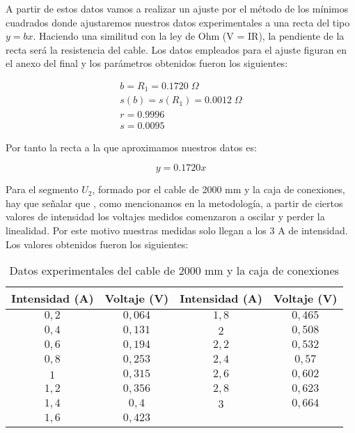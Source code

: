 \documentclass[a4paper,12pt,titlepage]{article}
\begin{document}
A partir de estos datos vamos a realizar un ajuste por el método de los mínimos cuadrados donde ajustaremos nuestros datos experimentales a una recta del tipo $y = bx$. Haciendo una similitud con la ley de Ohm (V = IR), la pendiente de la recta será la resistencia del cable. Los datos empleados para el ajuste figuran en el anexo del final y los parámetros obtenidos fueron los siguientes:

\begin{equation}
    \begin{gathered}
        b = R_{1} = 0.1720 \; \Omega \\
        s(b) = s(R_{1}) = 0.0012\; \Omega \\
        r =  0.9996 \\
        s =  0.0095
    \end{gathered}
\end{equation}

Por tanto la recta a la que aproximamos nuestros datos es:

\begin{equation}
    y = 0.1720x
\end{equation}

Para el segmento $U_{2}$, formado por el cable de 2000 mm y la caja de conexiones, hay que señalar que , como mencionamos en la metodología, a partir de ciertos valores de intensidad los voltajes medidos comenzaron a oscilar y perder la linealidad. Por este motivo nuestras medidas solo llegan a los $3$ A de intensidad. Los valores obtenidos fueron los siguientes:

\begin{table}[h!]
    \centering
    \begin{tabular}{|c|c|c|c|}
        \hline
        Intensidad (A) & Voltaje (V) & Intensidad (A) & Voltaje (V) \\ \hline
        $0,2$ & $0,064$ & $1,8$ & $0,465$ \\ \hline
        $0,4$ & $0,131$ & $2$ & $0,508$ \\\hline
        $0,6$ & $0,194$ & $2,2$ & $0,532$ \\\hline
        $0,8$ & $0,253$ & $2,4$ & $0,57$ \\\hline
        $1$ & $0,315$ & $2,6$ & $0,602$ \\\hline
        $1,2$ & $0,356$ & $2,8$ & $0,623$ \\\hline
        $1,4$ & $0,4$ & $3$ & $0,664$ \\\hline
        $1,6$ & $0,423$ & & \\
    \hline
    \end{tabular}
    \caption{Datos experimentales del cable de 2000 mm y la caja de conexiones}
\end{table}
\end{document}
